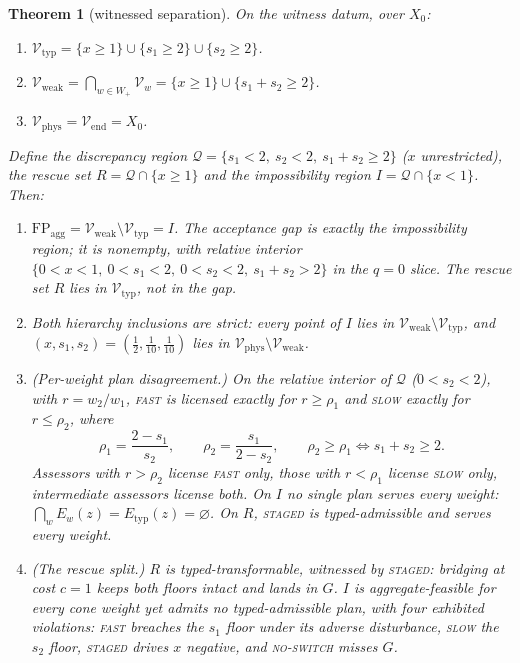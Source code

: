 \documentclass[preprint,11pt,authoryear]{elsarticle}
\newtheorem{theorem}{Theorem}
\theoremstyle{definition}
\theoremstyle{remark}
\newcommand{\Etyp}{E_{\mathrm{typ}}}
\newcommand{\Vtyp}{\mathcal{V}_{\mathrm{typ}}}
\newcommand{\Vweak}{\mathcal{V}_{\mathrm{weak}}}
\newcommand{\Vphys}{\mathcal{V}_{\mathrm{phys}}}
\newcommand{\Vend}{\mathcal{V}_{\mathrm{end}}}
\newcommand{\Wp}{W_+}
\newcommand{\FP}{\mathrm{FP}_{\mathrm{agg}}}
\newcommand{\Q}{\mathcal{Q}}
\newcommand{\act}[1]{\textsc{#1}}
\begin{document}
\begin{theorem}[witnessed separation]\label{thm:witness}
On the witness datum, over $X_0$:
\begin{enumerate}[label=\textup{(\arabic*)},leftmargin=2em]
\item $\Vtyp=\{x\ge1\}\cup\{s_1\ge2\}\cup\{s_2\ge2\}$.
\item $\Vweak=\bigcap_{w\in\Wp}\mathcal V_w=\{x\ge1\}\cup\{s_1+s_2\ge2\}$.
\item $\Vphys=\Vend=X_0$.
\end{enumerate}
Define the \emph{discrepancy region} $\Q=\{s_1<2,\ s_2<2,\ s_1+s_2\ge2\}$ ($x$ unrestricted), the \emph{rescue set} $R=\Q\cap\{x\ge1\}$ and the \emph{impossibility region} $I=\Q\cap\{x<1\}$. Then:
\begin{enumerate}[label=\textup{(\arabic*)},leftmargin=2em,resume]
\item $\FP=\Vweak\setminus\Vtyp=I$. The acceptance gap is exactly the impossibility region; it is nonempty, with relative interior $\{0<x<1,\ 0<s_1<2,\ 0<s_2<2,\ s_1+s_2>2\}$ in the $q=0$ slice. The rescue set $R$ lies in $\Vtyp$, not in the gap.
\item Both hierarchy inclusions are strict: every point of $I$ lies in $\Vweak\setminus\Vtyp$, and $(x,s_1,s_2)=(\tfrac12,\tfrac1{10},\tfrac1{10})$ lies in $\Vphys\setminus\Vweak$.
\item \textup{(Per-weight plan disagreement.)} On the relative interior of $\Q$ ($0<s_2<2$), with $r=w_2/w_1$, \act{fast} is licensed exactly for $r\ge\rho_1$ and \act{slow} exactly for $r\le\rho_2$, where
\[
\rho_1=\frac{2-s_1}{s_2},\qquad \rho_2=\frac{s_1}{2-s_2},\qquad \rho_2\ge\rho_1\iff s_1+s_2\ge2 .
\]
Assessors with $r>\rho_2$ license \act{fast} only, those with $r<\rho_1$ license \act{slow} only, intermediate assessors license both. On $I$ no single plan serves every weight: $\bigcap_wE_w(z)=\Etyp(z)=\varnothing$. On $R$, \act{staged} is typed-admissible and serves every weight.
\item \textup{(The rescue split.)} $R$ is typed-transformable, witnessed by \act{staged}: bridging at cost $c=1$ keeps both floors intact and lands in $G$. $I$ is aggregate-feasible for every cone weight yet admits no typed-admissible plan, with four exhibited violations: \act{fast} breaches the $s_1$ floor under its adverse disturbance, \act{slow} the $s_2$ floor, \act{staged} drives $x$ negative, and \act{no-switch} misses $G$.
\end{enumerate}
\end{theorem}
\end{document}
